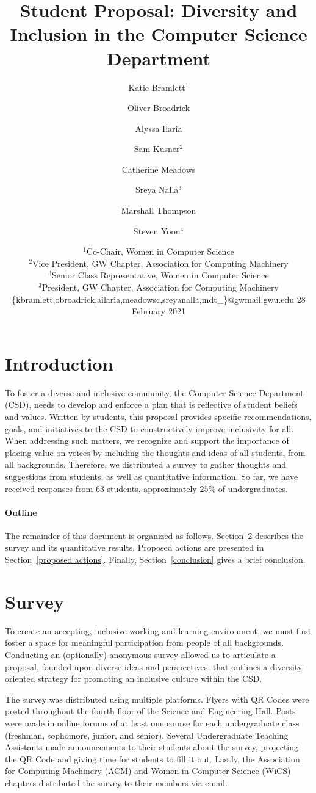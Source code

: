 \documentclass{article}
\title{Student Proposal: Diversity and Inclusion in the Computer Science Department}
\author{
Katie Bramlett$^1$\and
Oliver Broadrick\and
Alyssa Ilaria\and
Sam Kusner$^2$\and
Catherine Meadows\and
Sreya Nalla$^3$\and
Marshall Thompson\and
Steven Yoon$^4$
}
\date{%
    $^1$Co-Chair, Women in Computer Science\\
    $^2$Vice President, GW Chapter, Association for Computing Machinery\\
    $^3$Senior Class Representative, Women in Computer Science\\
    $^3$President, GW Chapter, Association for Computing Machinery\\
    \{kbramlett,obroadrick,ailaria,meadowsc,sreyanalla,mdt\_\}@gwmail.gwu.edu
    28 February 2021
}
\begin{document}
\maketitle


\section{Introduction}
To foster a diverse and inclusive community, the Computer Science Department (CSD), 
needs to develop and enforce a plan that is reflective of student beliefs and values.
Written by students, this proposal
provides specific recommendations, goals, and initiatives
to the CSD to constructively improve
inclusivity for all.
When addressing such matters, we recognize and support the importance of 
placing value on voices by including the thoughts and ideas of all students, from all backgrounds.
Therefore, we distributed a survey to gather thoughts and suggestions from students, as well as 
quantitative information. So far, we have
received responses from $63$ students, approximately $25\%$ of undergraduates.

\paragraph{Outline}
The remainder of this document is organized as follows.
Section~\ref{survey} describes the survey and its quantitative results.
Proposed actions are presented in Section~\ref{proposed actions}.
Finally, Section~\ref{conclusion} gives a brief conclusion.

\section{Survey}\label{survey}
To create an accepting, inclusive working and learning environment, we must 
first foster a space for meaningful participation from people of all backgrounds.
Conducting an (optionally) anonymous survey allowed us to articulate a proposal, 
founded upon diverse ideas and perspectives, that outlines a diversity-oriented
strategy for promoting an inclusive culture within the CSD.

The survey was distributed using multiple platforms. Flyers with QR Codes were posted
throughout the fourth floor of the Science and Engineering Hall.
Posts were made in online forums of at least one course
for each undergraduate class (freshman, sophomore, junior, and senior).
Several Undergraduate Teaching Assistants made announcements to their 
students about the survey, projecting the QR Code and giving time
for students to fill it out. Lastly, the Association for Computing Machinery (ACM) and Women 
in Computer Science (WiCS) chapters distributed the survey to their members via email. 
\end{document}
